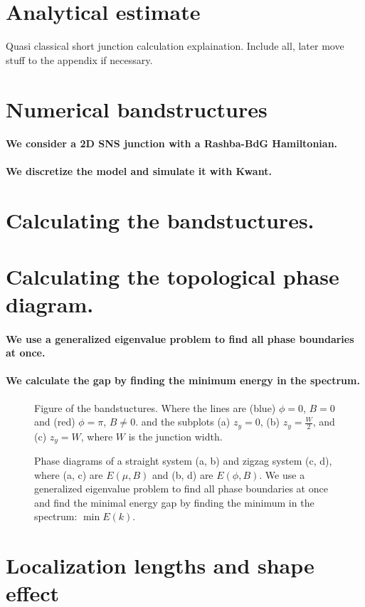 \documentclass[english, twocolumn, 10pt, aps, superscriptaddress, floatfix, prb, citeautoscript]{revtex4-1}
\renewcommand{\comment}[2]{#2}
\renewcommand{\comment}{\paragraph}
\begin{document}
\section{Analytical estimate}

Quasi classical short junction calculation explaination.
Include all, later move stuff to the appendix if necessary.


\section{Numerical bandstructures}

\comment{We consider a 2D SNS junction with a Rashba-BdG Hamiltonian.}

\comment{We discretize the model and simulate it with Kwant.}

\section{Calculating the bandstuctures.}

\section{Calculating the topological phase diagram.}

\comment{We use a generalized eigenvalue problem to find all phase boundaries at once.}

\comment{We calculate the gap by finding the minimum energy in the spectrum.}

\begin{figure}
\caption{Figure of the bandstuctures.
Where the lines are (blue) $\phi=0$, $B=0$ and (red) $\phi=\pi$, $B \ne 0$.
and the subplots (a) $z_y=0$, (b) $z_y=\frac{W}{2}$, and (c) $z_y=W$, where $W$ is the junction width.
\label{fig:bandstuctures}}
\end{figure}

\begin{figure}
\caption{Phase diagrams of a straight system (a, b) and zigzag system (c, d), where (a, c) are $E(\mu, B)$ and (b, d) are $E(\phi, B)$.
We use a generalized eigenvalue problem to find all phase boundaries at once and find the minimal energy gap by finding the minimum in the spectrum: $\min{E(k)}$.
\label{fig:phasediagrams}}
\end{figure}


\section{Localization lengths and shape effect}
\end{document}
